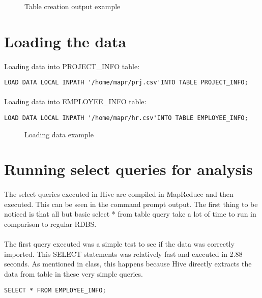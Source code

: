 \begin{figure}[H]
	\centering
	\caption{Table creation output example}
\end{figure}

\section{Loading the data}
\paragraph{}Loading data into PROJECT\_INFO table:
\begin{lstlisting}
LOAD DATA LOCAL INPATH '/home/mapr/prj.csv'INTO TABLE PROJECT_INFO;
\end{lstlisting}

\paragraph{}Loading data into EMPLOYEE\_INFO table:
\begin{lstlisting}
LOAD DATA LOCAL INPATH '/home/mapr/hr.csv'INTO TABLE EMPLOYEE_INFO;
\end{lstlisting}

\begin{figure}[H]
	\centering
	\caption{Loading data example}
\end{figure}

\section{Running select queries for analysis}
\paragraph{}The select queries executed in Hive are compiled in MapReduce and then executed. This can be seen in the command prompt output. The first thing to be noticed is that all but basic select * from table query take a lot of time to run in comparison to regular RDBS.

\paragraph{}The first query executed was a simple test to see if the data was correctly imported. This SELECT statements was relatively fast and executed in 2.88 seconds. As mentioned in class, this happens because Hive directly extracts the data from table in these very simple queries.
\begin{lstlisting}
SELECT * FROM EMPLOYEE_INFO;
\end{lstlisting}

